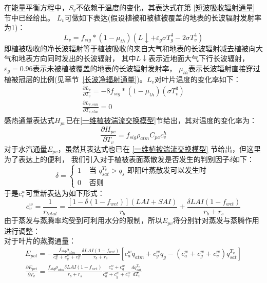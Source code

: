 在能量平衡方程中，$S_v$不依赖于温度的变化，其表达式在第 \ref{短波吸收辐射通量} 节中已经给出。
$L_v$可做如下表达(假设植被和被植被覆盖的地表的长波辐射发射率为1)：
\begin{equation}
L_{v}=f_{sig} *\left(1-\mu_{t h}\right)\left(L \downarrow+\varepsilon_{g} \sigma T_{g}^{4}-2 \sigma T_{v}^{4}\right)
\end{equation}
即植被吸收的净长波辐射等于植被吸收的来自大气和地表的长波辐射减去植被向大气和地表方向同时发出的长波辐射，
其中$L\downarrow$表示近地面大气下行长波辐射，$\varepsilon_g=0.96$表示未被植被覆盖的地表的长波辐射发射率，
$\mu_{th}$表示长波辐射直接穿过植被冠层的比例(见章节~\ref{长波净辐射通量})。$L_v$对叶片温度的变化率如下：
\begin{equation}
\begin{array}{c}\frac{\partial L_{v}}{\partial T_{v}}=-8 f_{sig} *\left(1-\mu_{t h}\right)\left(\sigma T_{v}^{3}\right) \\ \frac{\partial L_{v, s u n}}{\partial T_{v, s h a}}=0\end{array}
\end{equation}
感热通量表达式$H_{pv}$已在\ref{一维植被湍流交换模型}节给出，其对温度的变化率为：
\begin{equation}
\frac{\partial H_{p v}}{\partial T_{v}}=f_{sig} \rho_{atm} C_{pa} c_{v}^{h}
\end{equation}
对于水汽通量$E_{pv}$，虽然其表达式也已在 \ref{一维植被湍流交换模型} 节给出，但这里为了表达上的便利，
我们引入对于植被表面蒸散发是否发生的判别因子$\delta$如下：
\begin{equation}
\delta=\left\{\begin{array}{cc}1 & \text { 当 } q_{s a t}^{T_{v}}>q_{s} \text { 即阳叶蒸散发可以发生时 } \\ 0 & \text { 否则 }\end{array}\right.
\end{equation}
于是$c_v^w$可重新表达为如下形式：
\begin{equation}
c_{v}^{w}=\frac{1}{r_{total}}=\frac{\left[1-\delta\left(1-f_{wet}\right)\right](LAI+SAI)}{r_{b}}+\frac{\delta LAI\left(1-f_{wet}\right)}{r_{b}+r_{s}}
\end{equation}
由于蒸发与蒸腾率均受到可利用水分的限制，所以$E_{pv}$将分别针对蒸发与蒸腾作用进行调整：\\
对于叶片的蒸腾通量：
\begin{equation}
\begin{array}{c}E_{pvt}=-\frac{f_{sig} \rho_{atm}}{c_{a}^{w}+c_{g}^{w}+c_{v}^{w}} \frac{\delta LAI\left(1-f_{w e t}\right)}{r_{b}+r_{s}}\left[c_{a}^{w} q_{atm}+c_{g}^{w} q_{g}-\left(c_{a}^{w}+c_{g}^{w}+c_{v}^{w}\right) q_{s a t}^{T_{v}}\right] \\ \frac{\partial E_{pvt}}{\partial T_{v}}=\frac{f_{sig} \rho_{atm} \delta LAI\left(1-f_{w e t}\right)}{r_{b}+r_{s}} \frac{c_{a}^{w}+c_{g}^{w}}{c_{a}^{w}+c_{g}^{w}+c_{v}^{w}} \frac{d q_{s a t}^{T_{v}}}{d T_{v}}\end{array}
\end{equation}
